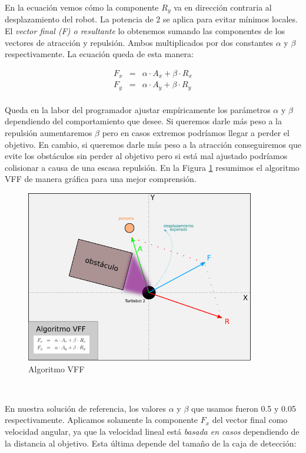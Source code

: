 En la ecuación vemos cómo la componente $R_y$ va en dirección contraria al desplazamiento del robot. La potencia de 2 se aplica para evitar mínimos locales.\\

El \textit{vector final (F) o resultante} lo obtenemos sumando las componentes de los vectores de atracción y repulsión. Ambos multiplicados por dos constantes $\alpha$ y $\beta$ respectivamente. La ecuación queda de esta manera:

\begin{eqnarray*}
F_x &=& \alpha \cdot A_x + \beta \cdot R_x\\
F_y &=& \alpha \cdot A_y + \beta \cdot R_y\\
\end{eqnarray*}

Queda en la labor del programador ajustar empíricamente los parámetros $\alpha$ y $\beta$ dependiendo del comportamiento que desee. Si queremos darle más peso a la repulsión aumentaremos $\beta$ pero en casos extremos podríamos llegar a perder el objetivo. En cambio, si queremos darle más peso a la atracción conseguiremos que evite los obstáculos sin perder al objetivo pero si está mal ajustado podríamos colisionar a causa de una escasa repulsión. En la Figura \ref{fig:esquema_vff} resumimos el algoritmo VFF de manera gráfica para una mejor comprensión.\\

\begin{figure} [H]
  \begin{center}
    \includegraphics[width=10cm]{imagenes/cap6/esquema-vff.png}
  \end{center}
  \caption[Algoritmo VFF]{Algoritmo VFF}
  \label{fig:esquema_vff}
\end{figure}\

En nuestra solución de referencia, los valores $\alpha$ y $\beta$ que usamos fueron 0.5 y 0.05 respectivamente. Aplicamos solamente la componente $F_x$ del vector final como velocidad angular, ya que la velocidad lineal está \textit{basada en casos} dependiendo de la distancia al objetivo. Esta última depende del tamaño de la caja de detección:

